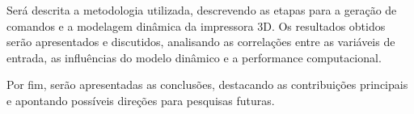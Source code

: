 Será descrita a metodologia utilizada, descrevendo as
etapas para a geração de comandos e a modelagem dinâmica da impressora 3D. Os resultados obtidos serão 
apresentados e discutidos, analisando as correlações entre as variáveis de entrada, as influências do 
modelo dinâmico e a performance computacional.

Por fim, serão apresentadas as conclusões, destacando as contribuições principais e apontando possíveis 
direções para pesquisas futuras.